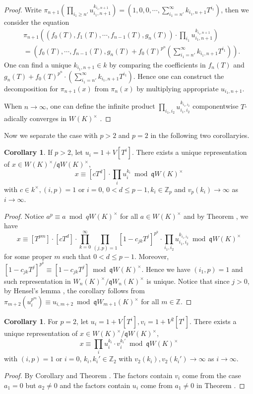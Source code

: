 \documentclass{proc-l}
\theoremstyle{definition}
\newtheorem{corollary}[theorem]{Corollary}
\theoremstyle{remark}
\numberwithin{equation}{section}
\begin{document}
{\begin{proof}
Write $\pi_{n+1}(\prod_{i_1\geq n'}u_{i_1,n+1}^{k_{i_1,n+1}})=(1,0,0,\cdots,\sum_{i_1=n'}^\infty k_{i_1,n+1}T^{i_1})$, then we consider the equation
\begin{eqnarray*}
&\pi_{n+1}((f_0(T),f_1(T),\cdots,f_{n-1}(T),g_{n}(T))\cdot\prod_{i_1}u_{i_1,n+1}^{k_{i_1,n+1}})\\
&=(f_0(T),\cdots,f_{n-1}(T),g_{n}(T)+f_0(T)^{p^n}(\sum_{i_1=n'}^\infty k_{i_1,n+1}T^{i_1})).
\end{eqnarray*}
One can find a unique $k_{i_1,n+1}\in k$ by comparing the coefficients in $f_n(T)$ and $g_{n}(T)+f_0(T)^{p^n}\cdot(\sum_{i_1=n'}^\infty k_{i_1,n+1}T^{i_1})$. Hence one can construct the decomposition for $\pi_{n+1}(x)$ from $\pi_{n}(x)$ by multiplying appropriate $u_{i_1,n+1}$.

When $n\rightarrow\infty$, one can define the infinite product $\prod_{i_1,i_2}u_{i_1,i_2}^{k_{i_1,i_2}}$ componentwise $T$-adically converges in $W(K)^\times$ .
\end{proof}
Now we separate the case with $p>2$ and $p=2$ in the following two corollaryies.
\begin{corollary}{\label{3.8}}
    If $p>2$, let $u_i=1+V[T^i]$. There exists a unique representation of $x\in W(K)^\times/\mathfrak qW(K)^\times$,
$$x\equiv [cT^d]\cdot\prod_{i}u_i^{k_i}\bmod\mathfrak qW(K)^\times$$
with $c\in k^\times, (i,p)=1$ or $i=0$, $0< d\leq p-1,k_i\in\mathbb Z_p$ and $v_p(k_i)\rightarrow\infty$ as $i\rightarrow\infty$.
\end{corollary}
\begin{proof}
    Notice $a^p\equiv a\bmod qW(K)^\times$ for all $a\in W(K)^\times$ and by Theorem \boxed{\ref{037}}, we have $$x\equiv[T^{pm}]\cdot[cT^d]\cdot\prod_{k=0}^\infty\prod_{(j,p)=1}[1-c_{jk}T^j]^{p^k}\cdot\prod_{i_1,i_2}u_{i_1,i_2}^{k_{i_1,i_2}}\bmod \mathfrak qW(K)^\times$$
    for some proper $m$ such that $0< d\leq p-1$. Moreover, $[1-c_{jk}T^j]^{p^k}\equiv[1-c_{jk}T^j]\bmod\mathfrak qW(K)^\times$. Hence we have $(i_1,p)=1$ and such representation in $W_n(K)^\times/\mathfrak qW_n(K)^\times$ is unique. Notice that since $j>0$, by Hensel's lemma \cite[Chapter 1, Theorem 3]{Koblitz1984}, the corollary follows from $\pi_{m+2}(u_i^{p^m})\equiv u_{i,m+2}\bmod\mathfrak qW_{m+1}(K)^\times$ for all $m\in\mathbb Z$.
\end{proof}
\begin{corollary}\label{3.7}
    For $p=2$, let $u_i=1+V[T^i],v_i=1+V^2[T^i]$. There exists a unique representation of $x\in W(K)^\times/\mathfrak qW(K)^\times$,
$$x\equiv\prod_{i}u_i^{k_i}\cdot v_i^{k_i'}\bmod\mathfrak qW(K)^\times$$
with $(i,p)=1$ or $i=0$, $k_i,k_i'\in\mathbb Z_2$ with $v_2(k_i),v_2(k_i')\rightarrow\infty$ as $i\rightarrow\infty$.
\end{corollary}
\begin{proof}
    By Corollary \boxed{\ref{3.8}} and Theorem \boxed{\ref{2.17}}. The factors contain $v_i$ come from the case $a_1=0$ but $a_2\neq0$ and the factors contain $u_i$ come from $a_1\neq0$ in Theorem \boxed{\ref{2.17}}. 
\end{proof}

}
\end{document}

